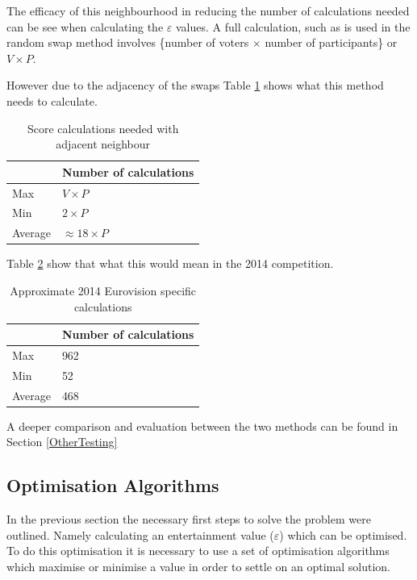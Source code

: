 \documentclass[12pt]{report}
\begin{document}
The efficacy of this neighbourhood in reducing the number of calculations needed can be see when calculating the $\varepsilon$ values. A full calculation, such as is used in the random swap method involves \{number of voters $\times$ number of participants\} or $V \times P$. 

However due to the adjacency of the swaps Table \ref{scoreCalcsAdj} shows what this method needs to calculate.

\begin{table}[H]
\centering
\caption{Score calculations needed with adjacent neighbour}
\label{scoreCalcsAdj}
\begin{tabular}{|l|l|}
\hline
        & Number of calculations \\ \hline
Max     & $V \times P$           \\ \hline
Min     & $2 \times P$           \\ \hline
Average & $\approx 18 \times P$          \\ \hline
\end{tabular}
\end{table}

Table \ref{scoreCalcsAdj2014} show that what this would mean in the 2014 competition.
\begin{table}[H]
\centering
\caption{Approximate 2014 Eurovision specific calculations}
\label{scoreCalcsAdj2014}
\begin{tabular}{|l|l|}
\hline
        & Number of calculations \\ \hline
Max     & 962                    \\ \hline
Min     & 52                     \\ \hline
Average & 468                    \\ \hline
\end{tabular}
\end{table}

A deeper comparison and evaluation between the two methods can be found in Section \ref{OtherTesting}

\subsection{Optimisation Algorithms}\label{Algorithms}
In the previous section the necessary first steps to solve the problem were outlined. Namely calculating an entertainment value ($\varepsilon$) which can be optimised. To do this optimisation it is necessary to use a set of optimisation algorithms which maximise or minimise a value in order to settle on an optimal solution.
\end{document}
